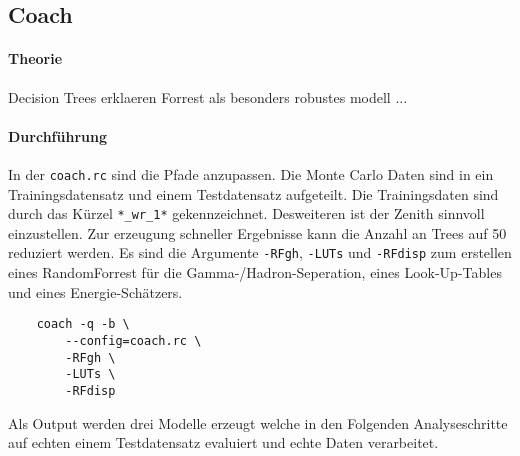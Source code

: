 \subsection{Coach}%
\label{sub:coach}

\paragraph{Theorie}%
\label{par:theorie}
Decision Trees erklaeren
Forrest als besonders robustes modell ...


\paragraph{Durchführung}%
In der \texttt{coach.rc} sind die Pfade anzupassen. 
Die Monte Carlo Daten sind in ein Trainingsdatensatz 
und einem Testdatensatz aufgeteilt.
Die Trainingsdaten sind durch das Kürzel 
\texttt{*\_wr\_1*} gekennzeichnet. 
Desweiteren ist der Zenith sinnvoll einzustellen.
Zur erzeugung schneller Ergebnisse kann die Anzahl an Trees auf \num{50}
reduziert werden.
Es sind die Argumente \texttt{-RFgh}, \texttt{-LUTs} und
\texttt{-RFdisp} zum erstellen eines RandomForrest für 
die Gamma-/Hadron-Seperation, eines Look-Up-Tables und 
eines Energie-Schätzers.
\begin{lstlisting}
	coach -q -b	\
		--config=coach.rc \
		-RFgh \
		-LUTs \
		-RFdisp 
\end{lstlisting}
Als Output werden drei Modelle erzeugt welche in den Folgenden Analyseschritte
auf echten einem Testdatensatz evaluiert und echte Daten verarbeitet.
